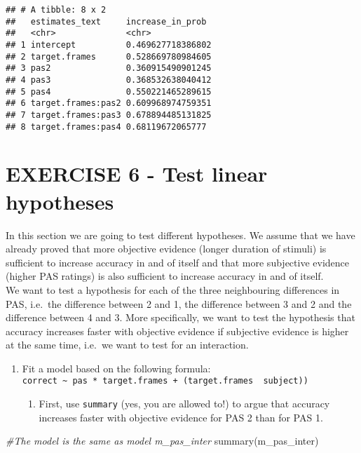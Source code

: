 \documentclass[
]{article}
\newenvironment{Shaded}{\begin{snugshade}}{\end{snugshade}}
\newcommand{\CommentTok}[1]{\textcolor[rgb]{0.56,0.35,0.01}{\textit{#1}}}
\newcommand{\FunctionTok}[1]{\textcolor[rgb]{0.00,0.00,0.00}{#1}}
\newcommand{\NormalTok}[1]{#1}
\providecommand{\tightlist}{%
  \setlength{\itemsep}{0pt}\setlength{\parskip}{0pt}}
\begin{document}
\begin{verbatim}
## # A tibble: 8 x 2
##   estimates_text     increase_in_prob 
##   <chr>              <chr>            
## 1 intercept          0.469627718386802
## 2 target.frames      0.528669780984605
## 3 pas2               0.360915490901245
## 4 pas3               0.368532638040412
## 5 pas4               0.550221465289615
## 6 target.frames:pas2 0.609968974759351
## 7 target.frames:pas3 0.678894485131825
## 8 target.frames:pas4 0.68119672065777
\end{verbatim}

\hypertarget{exercise-6---test-linear-hypotheses}{%
\section{EXERCISE 6 - Test linear
hypotheses}\label{exercise-6---test-linear-hypotheses}}

In this section we are going to test different hypotheses. We assume
that we have already proved that more objective evidence (longer
duration of stimuli) is sufficient to increase accuracy in and of itself
and that more subjective evidence (higher PAS ratings) is also
sufficient to increase accuracy in and of itself.\\
We want to test a hypothesis for each of the three neighbouring
differences in PAS, i.e.~the difference between 2 and 1, the difference
between 3 and 2 and the difference between 4 and 3. More specifically,
we want to test the hypothesis that accuracy increases faster with
objective evidence if subjective evidence is higher at the same time,
i.e.~we want to test for an interaction.

\begin{enumerate}
\def\labelenumi{\arabic{enumi})}
\tightlist
\item
  Fit a model based on the following formula:
  \texttt{correct\ \textasciitilde{}\ pas\ *\ target.frames\ +\ (target.frames\ \textbar{}\ subject))}

  \begin{enumerate}
  \def\labelenumii{\roman{enumii}.}
  \tightlist
  \item
    First, use \texttt{summary} (yes, you are allowed to!) to argue that
    accuracy increases faster with objective evidence for PAS 2 than for
    PAS 1.
  \end{enumerate}
\end{enumerate}

\begin{Shaded}
\begin{Highlighting}[]
\CommentTok{\#The model is the same as model m\_pas\_inter}
\FunctionTok{summary}\NormalTok{(m\_pas\_inter)}
\end{Highlighting}
\end{Shaded}
\end{document}
